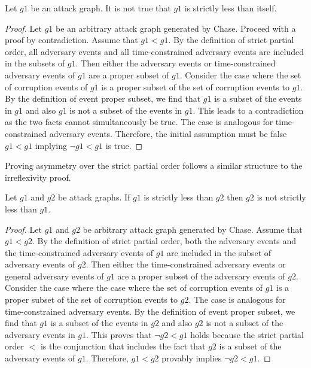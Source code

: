 \documentclass[runningheads]{llncs}
\theoremstyle{definition}
\begin{document}


\begin{theorem}
    Let $g1$ be an attack graph. It is not true that $g1$ is strictly less than itself.
\end{theorem}
\begin{proof}
    Let $g1$ be an arbitrary attack graph generated by Chase. Proceed with a proof by contradiction. Assume that $g1 < g1$. By the definition of strict partial order, all adversary events and all time-constrained adversary events are included in the subsets of $g1$. Then either the adversary events or time-constrained adversary events of $g1$ are a proper subset of $g1$. Consider the case where the set of corruption events of $g1$ is a proper subset of the set of corruption events to $g1$. By the definition of event proper subset, we find that $g1$ is a subset of the events in $g1$ and also $g1$ is not a subset of the events in $g1$. This leads to a contradiction as the two facts cannot simultaneously be true. The case is analogous for time-constrained adversary events.  Therefore, the initial assumption must be false $g1 < g1$ implying $\neg g1 < g1$ is true. 
\end{proof}

\noindent Proving asymmetry over the strict partial order follows a similar structure to the irreflexivity proof. 

\begin{theorem}
    Let $g1$ and $g2$ be attack graphs. If $g1$ is strictly less than $g2$ then $g2$ is not strictly less than $g1$. 
\end{theorem}
\begin{proof}
    Let $g1$ and $g2$ be arbitrary attack graph generated by Chase. Assume that $g1 < g2$. By the definition of strict partial order, both the adversary events and the time-constrained adversary events of $g1$ are included in the subset of adversary events of $g2$. Then either the time-constrained adversary events or general adversary events of $g1$ are a proper subset of the adversary events of $g2$. Consider the case where the case where the set of corruption events of $g1$ is a proper subset of the set of corruption events to $g2$. The case is analogous for time-constrained adversary events.  By the definition of event proper subset, we find that $g1$ is a subset of the events in $g2$ and also $g2$ is not a subset of the adversary events in $g1$. This proves that $\neg g2 < g1$ holds because the strict partial order $<$ is the conjunction that includes the fact that $g2$ is a subset of the adversary events of $g1$. Therefore, $g1 < g2$ provably implies $\neg g2 < g1$. 
\end{proof}
\end{document}
